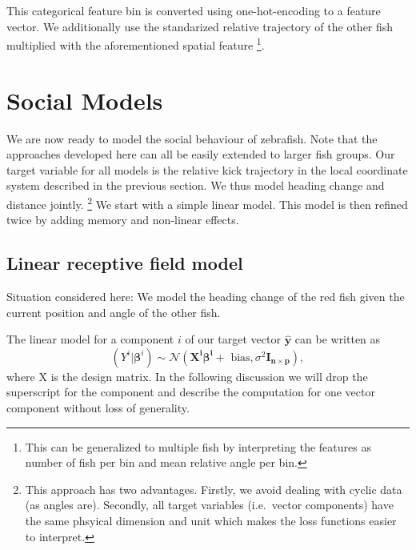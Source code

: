 \documentclass[nobib]{tufte-handout}
\begin{document}
This categorical feature bin is converted using one-hot-encoding to a feature vector.
We additionally use the standarized relative trajectory of the other fish multiplied with the aforementioned spatial feature%
\footnote{This can be generalized to multiple fish by interpreting the features as number of fish per bin and mean relative angle per bin.}.

\section{Social Models}\label{sec:social}
We are now ready to model the social behaviour of zebrafish.
Note that the approaches developed here can all be easily extended to larger fish groups.
Our target variable for all models is the relative kick trajectory in the local coordinate system described in the previous section.
We thus model heading change and distance jointly.%
\footnote{This approach has two advantages.
  Firstly, we avoid dealing with cyclic data (as angles are).
Secondly, all target variables (i.e.\ vector components) have the same phsyical dimension and unit which makes the loss functions easier to interpret.}
We start with a simple linear model.
This model is then refined twice by adding memory and non-linear effects.

\subsection{Linear receptive field model}
\begin{marginfigure}
 \caption{Situation considered here:
 We model the heading change of the red fish given the current position and angle of the other fish.}
\end{marginfigure}

The linear model for a component \(i\) of our target vector \(\hat{\bm{y}}\) can be written as
\begin{equation*}
 \left( Y^i | \bm{\beta}^{i} \right)  \sim \mathcal{N} \left( \bm{X^i} \bm{\beta^i} + \text{ bias}, \sigma^2 \bm{I_{n \times p}}  \right),
\end{equation*}
where X is the design matrix.
In the following discussion we will drop the superscript for the component and describe the computation for one vector component without loss of generality.
\end{document}

